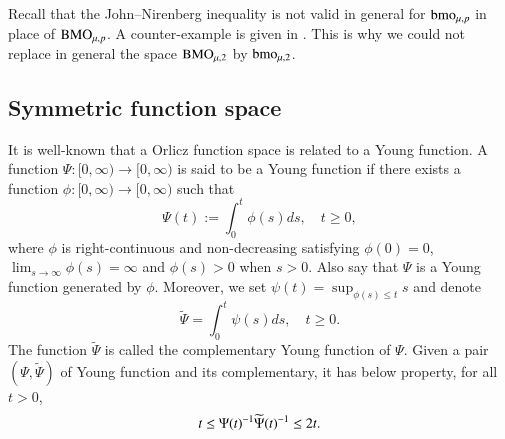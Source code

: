 \documentclass[leqno]{amsart}
\begin{document}
Recall that the John–Nirenberg inequality is not valid in general for ${\rm bmo}_{\mu,p}$ in place
of ${\rm BMO}_{\mu,p}$. A counter-example is given in \cite[Example 2.17]{We1994}. This is why we could not replace in general the space ${\rm BMO}_{\mu,2}$ by ${\rm bmo}_{\mu,2}$.




\subsection{Symmetric function space}
It is well-known that a Orlicz function space is related to a Young function.
A function  $\Psi:[0,\infty)\to[0,\infty)$ is said to be a Young function if there exists a function $\phi:[0,\infty)\to[0,\infty)$ such that $$\Psi(t):=\int_{0}^{t}\phi(s)ds,\quad t\geq0,$$
where $\phi$ is right-continuous and non-decreasing satisfying $\phi(0)=0$, $\displaystyle\lim_{s\to\infty}\phi(s)=\infty$ and $\phi(s)>0$ when $s>0$. Also say that $\Psi$ is a Young function generated by $\phi$. Moreover, we set $\displaystyle\psi(t)=\sup_{\phi(s)\leq t}s$ and denote $$\widetilde{\Psi}=\int_{0}^{t}\psi(s)ds,\quad t\geq0.$$
The function $\widetilde{\Psi}$ is called the complementary Young function of $\Psi$.
Given a pair  $(\Psi,\widetilde{\Psi})$ of Young function and its complementary, it has below property, for all $t>0$,
\begin{align*}
t\leq\Psi(t)^{-1}\widetilde{\Psi}(t)^{-1}\leq 2t.
\end{align*}  
 
\end{document}
